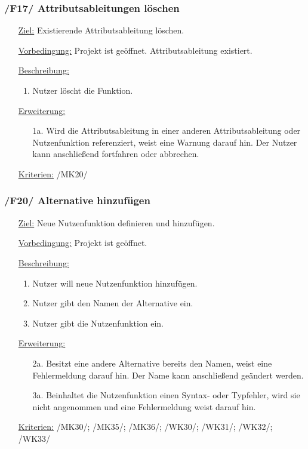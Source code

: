 \documentclass{article}
\begin{document}
\subsubsection*{/F17/ Attributsableitungen löschen}
\begin{itemize}
    \item[\underline{Ziel:}] Existierende Attributsableitung löschen.
    \item[\underline{Vorbedingung:}] Projekt ist geöffnet. Attributsableitung existiert.
    \item[\underline{Beschreibung:}]
    \begin{enumerate}
        \item Nutzer löscht die Funktion.
    \end{enumerate}
    \item[\underline{Erweiterung:}]
    \begin{itemize}
        \item[1a.] Wird die Attributsableitung in einer anderen Attributsableitung oder Nutzenfunktion referenziert, weist eine Warnung darauf hin. Der Nutzer kann anschließend fortfahren oder abbrechen.
    \end{itemize}
    \item[\underline{Kriterien:}] /MK20/
\end{itemize}

\subsubsection*{/F20/ Alternative hinzufügen}
\begin{itemize}
    \item[\underline{Ziel:}] Neue Nutzenfunktion definieren und hinzufügen.
    \item[\underline{Vorbedingung:}] Projekt ist geöffnet.
    \item[\underline{Beschreibung:}]
    \begin{enumerate}
        \item Nutzer will neue Nutzenfunktion hinzufügen.
        \item Nutzer gibt den Namen der Alternative ein.
        \item Nutzer gibt die Nutzenfunktion ein.
    \end{enumerate}
    \item[\underline{Erweiterung:}]
    \begin{itemize}
        \item[2a.] Besitzt eine andere Alternative bereits den Namen, weist eine Fehlermeldung darauf hin. Der Name kann anschließend geändert werden.
        \item[3a.] Beinhaltet die Nutzenfunktion einen Syntax- oder Typfehler, wird sie nicht angenommen und eine Fehlermeldung weist darauf hin.
    \end{itemize}
    \item[\underline{Kriterien:}] /MK30/; /MK35/; /MK36/; /WK30/; /WK31/; /WK32/; /WK33/
\end{itemize}
\end{document}
